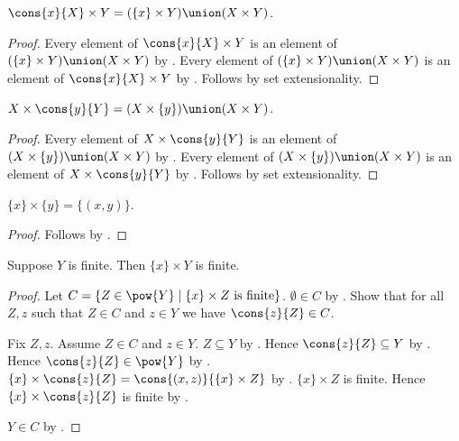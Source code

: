 \begin{proposition}\label{times_cons_left}
    $\cons{x}{X}\times Y=(\{x\}\times Y)\union(X\times Y)$.
\end{proposition}
\begin{proof}
    Every element of $\cons{x}{X}\times Y$ is an element of
        $(\{x\}\times Y)\union(X\times Y)$
        by .
    Every element of $(\{x\}\times Y)\union(X\times Y)$ is an element of
        $\cons{x}{X}\times Y$
        by .
    Follows by set extensionality.
\end{proof}

\begin{proposition}\label{times_cons_right}
    $X\times\cons{y}{Y}=(X\times\{y\})\union(X\times Y)$.
\end{proposition}
\begin{proof}
    Every element of $X\times\cons{y}{Y}$ is an element of
        $(X\times\{y\})\union(X\times Y)$
        by .
    Every element of $(X\times\{y\})\union(X\times Y)$ is an element of
        $X\times\cons{y}{Y}$
        by .
    Follows by set extensionality.
\end{proof}

\begin{proposition}\label{times_singletons}
    $\{x\}\times\{y\}=\{(x,y)\}$.
\end{proposition}
\begin{proof}
    Follows by
        .
\end{proof}

\begin{lemma}\label{singleton_times_finite}
    Suppose $Y$ is finite.
    Then $\{x\}\times Y$ is finite.
\end{lemma}
\begin{proof}
    Let $C=\{Z\in\pow{Y}\mid
        \text{$\{x\}\times Z$ is finite}\}$.
    $\emptyset\in C$
        by
        .
    Show that for all $Z,z$ such that $Z\in C$ and $z\in Y$ we have
        $\cons{z}{Z}\in C$.
    \begin{subproof}
        Fix $Z,z$.
        Assume $Z\in C$ and $z\in Y$.
        $Z\subseteq Y$ by .
        Hence $\cons{z}{Z}\subseteq Y$
            by .
        Hence $\cons{z}{Z}\in\pow{Y}$ by .
        $\{x\}\times\cons{z}{Z}
            =\cons{(x,z)}{\{x\}\times Z}$
            by
            .
        $\{x\}\times Z$ is finite.
        Hence $\{x\}\times\cons{z}{Z}$ is finite
            by .
    \end{subproof}
    $Y\in C$ by .
\end{proof}

